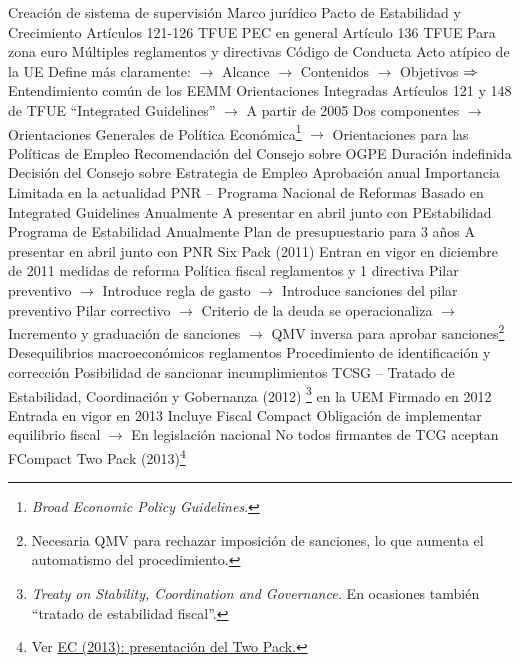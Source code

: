 \documentclass{nuevotema}
\begin{document}
\begin{esquemal}
				\4[] Creación de sistema de supervisión
		\2 Marco jurídico
			\3 Pacto de Estabilidad y Crecimiento
				\4 Artículos 121-126 TFUE
				\4[] PEC en general
				\4 Artículo 136 TFUE
				\4[] Para zona euro
				\4 Múltiples reglamentos y directivas
				\4 Código de Conducta
				\4[] Acto atípico de la UE
				\4[] Define más claramente:
				\4[] $\to$ Alcance
				\4[] $\to$ Contenidos
				\4[] $\to$ Objetivos
				\4[] $\Rightarrow$ Entendimiento común de los EEMM
			\3 Orientaciones Integradas
				\4 Artículos 121 y 148 de TFUE
				\4[] ``Integrated Guidelines''
				\4[] $\to$ A partir de 2005
				\4 Dos componentes
				\4[] $\to$ Orientaciones Generales de Política Económica\footnote{\textit{Broad Economic Policy Guidelines}.}
				\4[] $\to$ Orientaciones para las Políticas de Empleo
				\4 Recomendación del Consejo sobre OGPE
				\4[] Duración indefinida
				\4 Decisión del Consejo sobre Estrategia de Empleo
				\4[] Aprobación anual
				\4 Importancia
				\4[] Limitada en la actualidad
			\3 PNR -- Programa Nacional de Reformas
				\4 Basado en Integrated Guidelines
				\4 Anualmente
				\4 A presentar en abril junto con PEstabilidad
			\3 Programa de Estabilidad
				\4 Anualmente
				\4 Plan de presupuestario para 3 años
				\4 A presentar en abril junto con PNR
			\3 Six Pack (2011)
				\4 Entran en vigor en diciembre de 2011
				 medidas de reforma
				\4 Política fiscal
				 reglamentos y 1 directiva
				\4[] Pilar preventivo
				\4[] $\to$ Introduce regla de gasto
				\4[] $\to$ Introduce sanciones del pilar preventivo
				\4[] Pilar correctivo
				\4[] $\to$ Criterio de la deuda se operacionaliza
				\4[] $\to$ Incremento y graduación de sanciones
				\4[] $\to$ QMV inversa para aprobar sanciones\footnote{Necesaria QMV para rechazar imposición de sanciones, lo que aumenta el automatismo del procedimiento.}
				\4 Desequilibrios macroeconómicos
				 reglamentos
				\4[] Procedimiento de identificación y corrección
				\4[] Posibilidad de sancionar incumplimientos
			\3 TCSG -- Tratado de Estabilidad, Coordinación y Gobernanza (2012) \footnote{\textit{Treaty on Stability, Coordination and Governance.} En ocasiones también ``tratado de estabilidad fiscal''.} en la UEM
				\4 Firmado en 2012
				\4 Entrada en vigor en 2013
				\4 Incluye Fiscal Compact
				\4[] Obligación de implementar equilibrio fiscal
				\4[] $\to$ En legislación nacional
				\4[] No todos firmantes de TCG aceptan FCompact
			\3 Two Pack (2013)\footnote{Ver \href{https://ec.europa.eu/commission/presscorner/detail/en/MEMO_13_196}{EC (2013): presentación del Two Pack.}}

\end{esquemal}
\end{document}
